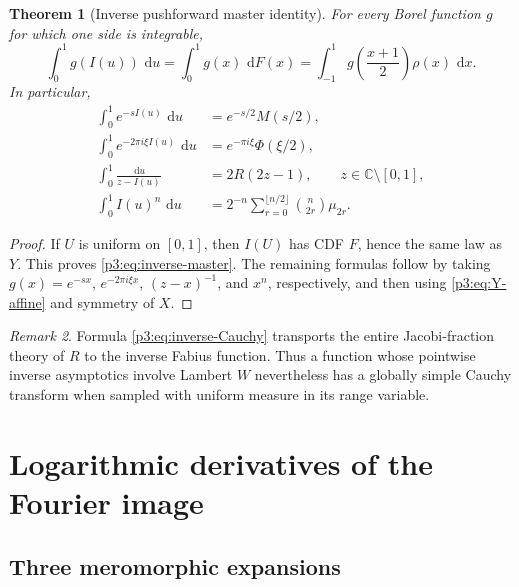 \documentclass[11pt]{article}
\newtheorem{theorem}{Theorem}[section]
\theoremstyle{definition}
\theoremstyle{remark}
\newtheorem{remark}[theorem]{Remark}
\newcommand{\C}{\mathbb C}
\newcommand{\dd}{\,\mathrm d}
\begin{document}
\begin{theorem}[Inverse pushforward master identity]\label{p3:thm:inverse-pushforward}
For every Borel function \(g\) for which one side is integrable,
\begin{equation}
 \boxed{
 \int_0^1g(I(u))\,\dd u
 =\int_0^1g(x)\,\dd F(x)
 =\int_{-1}^{1}g\!\left(\frac{x+1}{2}\right)\rho(x)\,\dd x.
 }                                                           \label{p3:eq:inverse-master}
\end{equation}
In particular,
\begin{align}
 \int_0^1 e^{-sI(u)}\,\dd u
 &=e^{-s/2}M(s/2),                                           \label{p3:eq:inverse-Laplace}\\
 \int_0^1 e^{-2\pi i\xi I(u)}\,\dd u
 &=e^{-\pi i\xi}\Phi(\xi/2),                              \label{p3:eq:inverse-Fourier}\\
 \int_0^1\frac{\dd u}{z-I(u)}
 &=2R(2z-1),\qquad z\in\C\setminus[0,1],                   \label{p3:eq:inverse-Cauchy}\\
 \int_0^1I(u)^n\,\dd u
 &=2^{-n}\sum_{r=0}^{\lfloor n/2\rfloor}
   \binom{n}{2r}\mu_{2r}.                                   \label{p3:eq:inverse-moments}
\end{align}
\end{theorem}

\begin{proof}
If \(U\) is uniform on \([0,1]\), then \(I(U)\) has CDF \(F\), hence the same law as
\(Y\).  This proves \eqref{p3:eq:inverse-master}.  The remaining formulas follow by taking
\(g(x)=e^{-sx}\), \(e^{-2\pi i\xi x}\), \((z-x)^{-1}\), and \(x^n\), respectively,
and then using \eqref{p3:eq:Y-affine} and symmetry of \(X\).
\end{proof}

\begin{remark}
Formula \eqref{p3:eq:inverse-Cauchy} transports the entire Jacobi-fraction theory of \(R\) to
the inverse Fabius function.  Thus a function whose pointwise inverse asymptotics involve
Lambert \(W\) nevertheless has a globally simple Cauchy transform when sampled with
uniform measure in its range variable.
\end{remark}

\section{Logarithmic derivatives of the Fourier image}

\subsection{Three meromorphic expansions}
\end{document}
